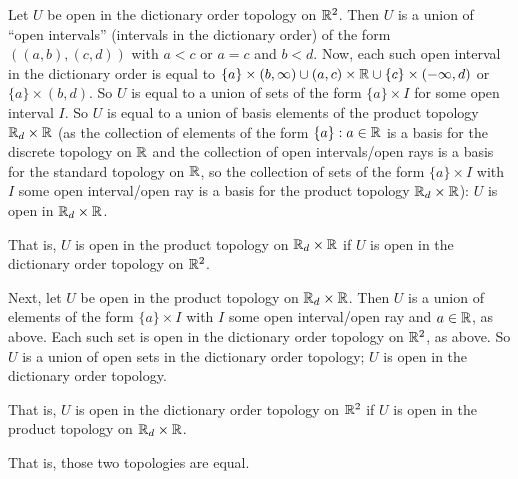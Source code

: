 \documentclass[a4paper,12pt]{article}
\begin{document}
Let $U$ be open in the dictionary order topology on $\mathbb{R}^2$. Then $U$ is a union of ``open intervals'' (intervals in the dictionary order) of the form $((a,b),(c,d))$ with $a<c$ or $a=c$ and $b<d$. Now, each such open interval in the dictionary order is equal to $\{a\} \times (b,\infty) \cup  (a,c) \times \mathbb{R} \cup \{c\} \times (-\infty, d)$ or $\{a\} \times (b,d)$. So $U$ is equal to a union of sets of the form $\{a\} \times I$ for some open interval $I$. So $U$ is equal to a union of basis elements of the product topology $\mathbb{R}_d \times \mathbb{R}$ (as the collection of elements of the form $\{a\}: a \in \mathbb{R}$ is a basis for the discrete topology on $\mathbb{R}$ and the collection of open intervals/open rays is a basis for the standard topology on $\mathbb{R}$, so the collection of sets of the form $\{a\} \times I$ with $I$ some open interval/open ray is a basis for the product topology $\mathbb{R}_d \times \mathbb{R}$): $U$ is open in $\mathbb{R}_d \times \mathbb{R}$.

That is, $U$ is open in the product topology on $\mathbb{R}_d \times \mathbb{R}$ if $U$ is open in the dictionary order topology on $\mathbb{R}^2$.

Next, let $U$ be open in the product topology on $\mathbb{R}_d \times \mathbb{R}$. Then $U$ is a union of elements of the form $\{a\} \times I$ with $I$ some open interval/open ray and $a \in \mathbb{R}$, as above. Each such set is open in the dictionary order topology on $\mathbb{R}^2$, as above. So $U$ is a union of open sets in the dictionary order topology; $U$ is open in the dictionary order topology.

That is, $U$ is open in the dictionary order topology on $\mathbb{R}^2$ if $U$ is open in the product topology on $\mathbb{R}_d \times \mathbb{R}$.

That is, those two topologies are equal. 

\shunt
\end{document}
